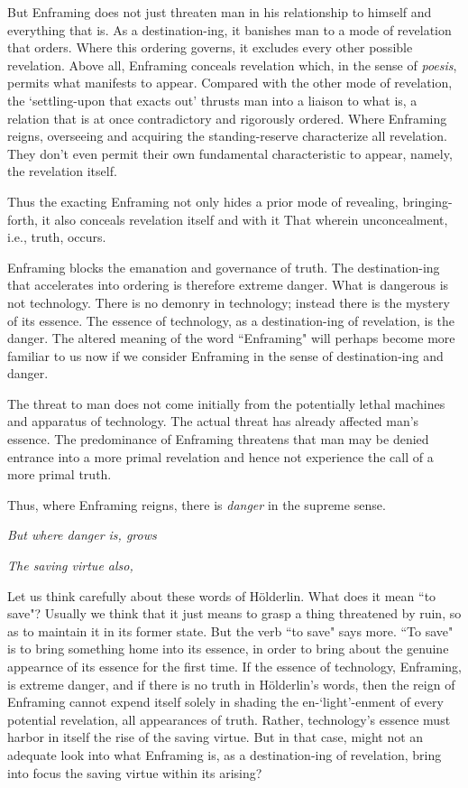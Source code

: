 \documentclass[paper=a4, fontsize=11pt,twoside]{scrartcl}
\begin{document}
But Enframing does not just threaten man in his relationship to himself and everything that is. As a destination-ing, it banishes man to a mode of revelation that orders. Where this ordering governs, it excludes every other possible revelation. Above all, Enframing conceals revelation which, in the sense of \textit{p{\-o}esis}, permits what manifests to appear. Compared with the other mode of revelation, the `settling-upon that exacts out' thrusts man into a liaison to what is, a relation that is at once contradictory and rigorously ordered. Where Enframing reigns, overseeing and acquiring the standing-reserve characterize all revelation. They don't even permit their own fundamental characteristic to appear, namely, the revelation itself.

Thus the exacting Enframing not only hides a prior mode of revealing, bringing-forth, it also conceals revelation itself and with it That wherein unconcealment, i.e., truth, occurs.

Enframing blocks the emanation and governance of truth. The destination-ing that accelerates into ordering is therefore extreme danger. What is dangerous is not technology. There is no demonry in technology; instead there is the mystery of its essence. The essence of technology, as a destination-ing of revelation, is the danger. The altered meaning of the word ``Enframing" will perhaps become more familiar to us now if we consider Enframing in the sense of destination-ing and danger.

The threat to man does not come initially from the potentially lethal machines and apparatus of technology. The actual threat has already affected man's essence. The predominance of Enframing threatens that man may be denied entrance into a more primal revelation and hence not experience the call of a more primal truth.

Thus, where Enframing reigns, there is \textit{danger} in the supreme sense.

\vspace{5mm}

\begin{center}
\textit{But where danger is, grows}

\textit{The saving virtue also,}
\end{center}

\vspace{5mm}

Let us think carefully about these words of H{\"o}lderlin. What does it mean ``to save"? Usually we think that it just means to grasp a thing threatened by ruin, so as to maintain it in its former state. But the verb ``to save" says more. ``To save" is to bring something home into its essence, in order to bring about the genuine appearnce of its essence for the first time. If the essence of technology, Enframing, is extreme danger, and if there is no truth in H{\"o}lderlin's words, then the reign of Enframing cannot expend itself solely in shading the en-`light'-enment of every potential revelation, all appearances of truth. Rather, technology's essence must harbor in itself the rise of the saving virtue. But in that case, might not an adequate look into what Enframing is, as a destination-ing of revelation, bring into focus the saving virtue within its arising? 
\end{document}
